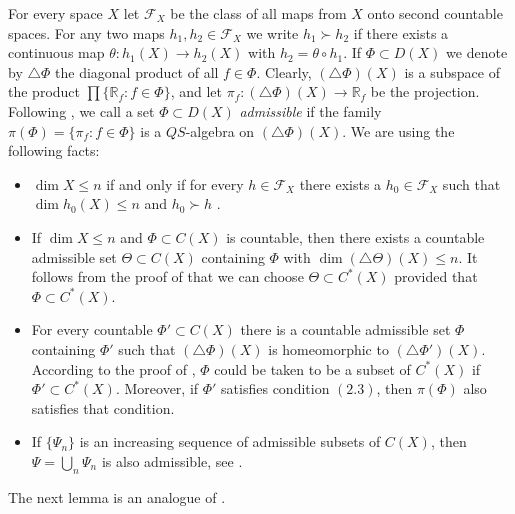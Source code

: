 \documentclass[12pt]{amsart}
\begin{document}
For every space $X$ let $\mathcal F_X$ be the class of all maps from $X$ onto second countable spaces. For any two maps $h_1,h_2\in\mathcal F_X$ we write
$h_1\succ h_2$ if there exists a continuous map $\theta:h_1(X)\to h_2(X)$ with $h_2=\theta\circ h_1$. If $\Phi\subset D(X)$ we denote by $\triangle\Phi$ the diagonal product of all $f\in\Phi$. Clearly, $(\triangle\Phi)(X)$ is a subspace of the product $\prod\{\mathbb R_f:f\in\Phi\}$, and 
let $\pi_f:(\triangle\Phi)(X)\to\mathbb R_f$ be the projection.
Following \cite{gu}, we call a set $\Phi\subset D(X)$ {\em admissible} if the family
$\pi(\Phi)=\{\pi_f:f\in\Phi\}$ is a $QS$-algebra on $(\triangle\Phi)(X)$. 
We are using the following facts:
\begin{itemize}
\item[(3.1)] $\dim X\leq n$ if and only if for every $h\in\mathcal F_X$ there exists a $h_0\in\mathcal F_X$ such that $\dim h_0(X)\leq n$ and $h_0\succ h$ \cite{p}.
\item[(3.2)] If $\dim X\leq n$ and $\Phi\subset C(X)$ is countable, then there exists a countable admissible set $\Theta\subset C(X)$ containing $\Phi$ with $\dim(\triangle\Theta)(X)\leq n$. It follows from the proof of \cite[Lemma 2.2]{gu} that we can choose $\Theta\subset C^*(X)$ provided that
    $\Phi\subset C^*(X)$.
\item[(3.3)] For every countable $\Phi'\subset C(X)$ there is a countable admissible set $\Phi$ containing $\Phi'$ such that $(\triangle\Phi)(X)$ is homeomorphic to $(\triangle\Phi')(X)$. According to the proof of \cite[Lemma 2.4]{gu}, $\Phi$ could be taken to be a subset of $C^*(X)$ if $\Phi'\subset C^*(X)$. Moreover, if $\Phi'$ satisfies condition $(2.3)$, then $\pi(\Phi)$ also satisfies that condition.
\item[(3.4)] If $\{\Psi_n\}$ is an increasing sequence of admissible subsets of $C(X)$, then $\Psi=\bigcup_n\Psi_n$ is also admissible, see \cite[Lemma 2.5]{gu}.
    \end{itemize}
The next lemma is an analogue of \cite[Lemma 4.3]{ev}.
\end{document}
